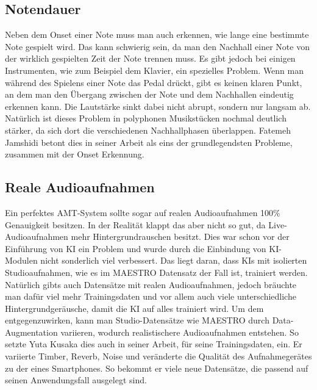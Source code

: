 \subsection{Notendauer}
Neben dem Onset einer Note muss man auch erkennen, wie lange eine bestimmte Note gespielt wird.
Das kann schwierig sein, da man den Nachhall einer Note von der wirklich gespielten Zeit der Note trennen muss.
Es gibt jedoch bei einigen Instrumenten, wie zum Beispiel dem Klavier, ein spezielles Problem.
Wenn man während des Spielens einer Note das Pedal drückt, gibt es keinen klaren Punkt,
an dem man den Übergang zwischen der Note und dem Nachhallen eindeutig erkennen kann.
Die Lautstärke sinkt dabei nicht abrupt, sondern nur langsam ab.
Natürlich ist dieses Problem in polyphonen Musikstücken nochmal deutlich stärker,
da sich dort die verschiedenen Nachhallphasen überlappen.
Fatemeh Jamshidi betont dies in seiner Arbeit als eins der grundlegendsten Probleme, zusammen mit der Onset Erkennung.
\cite{jamshidi2024machine}

\subsection{Reale Audioaufnahmen}
Ein perfektes AMT-System sollte sogar auf realen Audioaufnahmen 100\% Genauigkeit besitzen.
In der Realität klappt das aber nicht so gut, da Live-Audioaufnahmen mehr Hintergrundrauschen besitzt.
Dies war schon vor der Einführung von KI ein Problem und wurde durch die Einbindung
von KI-Modulen nicht sonderlich viel verbessert.
Das liegt daran, dass KIs mit isolierten Studioaufnahmen, wie es im MAESTRO Datensatz der Fall ist, trainiert werden.
Natürlich gibts auch Datensätze mit realen Audioaufnahmen, jedoch bräuchte man dafür viel mehr Trainingsdaten und
vor allem auch viele unterschiedliche Hintergrundgeräusche, damit die KI auf alles trainiert wird.
Um dem entgegenzuwirken, kann man Studio-Datensätze wie MAESTRO durch Data-Augmentation variieren,
wodurch realistischere Audioaufnahmen entstehen.
So setzte Yuta Kusaka dies auch in seiner Arbeit, für seine Trainingsdaten, ein.
\cite{kusaka2024mobile}
Er variierte Timber, Reverb, Noise und veränderte die Qualität des Aufnahmegerätes zu der eines Smartphones.
So bekommt er viele neue Datensätze, die passend auf seinen Anwendungsfall ausgelegt sind.

